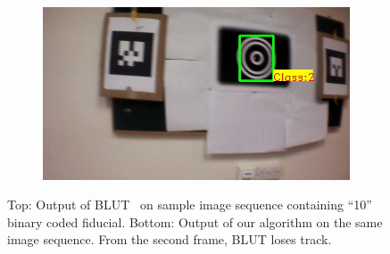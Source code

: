 \begin{figure}[ht!]
\begin{subfigure}[b]{.19\textwidth}
\end{subfigure}
\begin{subfigure}[b]{.19\textwidth}
\includegraphics[width=\linewidth]{figures/fiducial/BLUT_input_10/output5.jpg}
\end{subfigure}
\caption[Output of BLUT on ARTag and our fiducial with  code ``10'']{Top: Output
of BLUT~\cite{Wu:2011} on sample image sequence containing ``10'' binary coded fiducial. Bottom: Output of our algorithm on the same image
sequence. From the second frame, BLUT loses track.}
\label{fig:BLUT_compare_10}
\end{figure}


